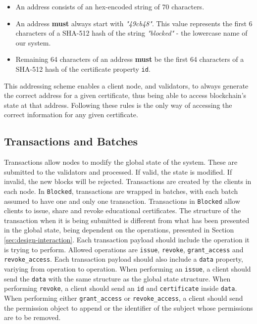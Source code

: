 \begin{itemize}
	\item An address consists of an hex-encoded string of 70 characters.
	\item An address \textbf{must} always start with \emph{"49cb48"}. This value represents the first 6 characters of a SHA-512 hash of the string \emph{"blocked"} - the lowercase name of our system.
	\item Remaining 64 characters of an address \textbf{must} be the first 64 characters of a SHA-512 hash of the certificate property \texttt{id}.
\end{itemize}

This addressing scheme enables a client node, and validators, to always generate the correct address for a given certificate, thus being able to access blockchain's state at that address. Following these rules is the only way of accessing the correct information for any given certificate.

\subsection{Transactions and Batches}
\label{sec:design-transactions}

Transactions allow nodes to modify the global state of the system. These are submitted to the validators and processed. If valid, the state is modified. If invalid, the new blocks will be rejected. Transactions are created by the clients in each node. In \texttt{Blocked}, transactions are wrapped in batches, with each batch assumed to have one and only one transaction. Transactions in \texttt{Blocked} allow clients to issue, share and revoke educational certificates. The structure of the transaction when it is being submitted is different from what has been presented in the global state, being dependent on the operations, presented in Section \ref{sec:design-interaction}. Each transaction payload should include the operation it is trying to perform. Allowed operations are \texttt{issue}, \texttt{revoke}, \texttt{grant\_access} and \texttt{revoke\_access}. Each transaction payload should also include a \texttt{data} property, variying from operation to operation. When performing an \texttt{issue}, a client should send the \texttt{data} with the same structure as the global state structure. When performing \texttt{revoke}, a client should send an \texttt{id} and \texttt{certificate} inside \texttt{data}. When performing either \texttt{grant\_access} or \texttt{revoke\_access}, a client should send the permission object to append or the identifier of the subject whose permissions are to be removed.

